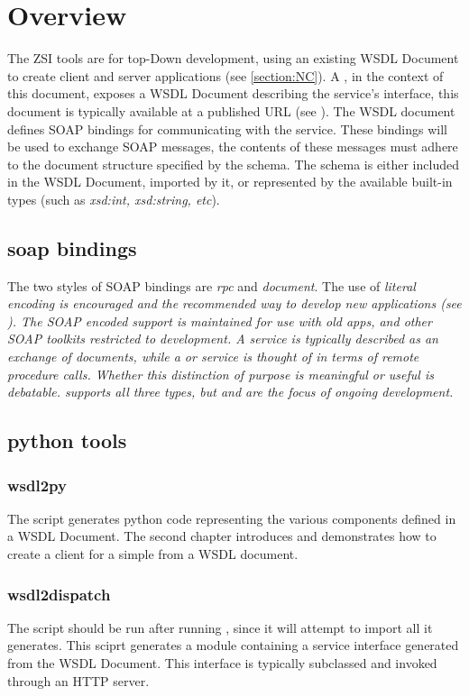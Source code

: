 \section{Overview}
The ZSI \WS tools are for top-Down \WS development, using an existing WSDL
Document to create client and server applications (see \ref{section:NC}). A \WS, in the context of this document, exposes a WSDL Document describing the
service's interface, this document is typically available at a published URL (see
\URL).  The WSDL document defines SOAP bindings for communicating with the 
service. These bindings will be used to exchange SOAP messages, the contents of
these messages must adhere to the document structure specified by the schema. The 
schema is either included in the WSDL Document, imported by it, or represented
by the available built-in types (such as \emph{xsd:int, xsd:string, etc}).  

\subsection{soap bindings}
The two styles of SOAP bindings are \emph{rpc} and \emph{document}.  The use of
\it{literal} encoding is encouraged and the recommended way to develop new \WS
applications (see \WSI).  The SOAP \it{encoded} support is maintained for use
with old apps, and other SOAP toolkits restricted to \RPCENC development.  A
\DOCLIT service is typically described as an exchange of documents, while a
\RPCENC or \RPCLIT service is thought of in terms of remote procedure calls.
Whether this distinction of purpose is meaningful or useful is debatable.  \ZSI
supports all three types, but \RPCLIT and \DOCLIT are the focus of ongoing 
development.

\subsection{python tools}
\subsubsection{wsdl2py}
The \WPY script generates python code representing the various components
defined in a WSDL Document.  The second chapter introduces \WPY and demonstrates
how to create a client for a simple \WS from a WSDL document.
\subsubsection{wsdl2dispatch}
The \WPYDIS script should be run after running \WPY, since it will attempt to
import all it generates.  This sciprt generates a module containing a service
interface generated  from the WSDL Document. This interface is typically
subclassed and invoked through an HTTP server. 


